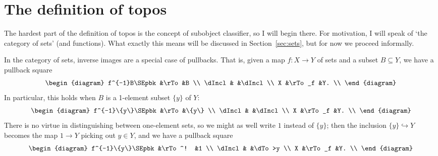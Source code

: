 \documentclass[12pt]{article}
\newcommand{\sub}{\subseteq}
\newcommand{\incl}{\hookrightarrow}
\newcommand{\cln}{\colon}
\begin{document}
\section{The definition of topos}
\label{sec:defn}



The hardest part of the definition of topos is the concept of subobject
classifier, so I will begin there.  For motivation, I will speak of `the
category of sets' (and functions).  What exactly this means will be discussed
in Section~\ref{sec:sets}, but for now we proceed informally.

In the category of sets, inverse images are a special case of pullbacks.
That is, given a map $f\cln X \to Y$ of sets and a subset $B \sub Y$, we have a
pullback square
\[
\begin{diagram}
f^{-1}B\SEpbk   &\rTo   &B      \\
\dIncl          &       &\dIncl \\
X               &\rTo_f &Y.     \\
\end{diagram}
\]
In particular, this holds when $B$ is a 1-element subset $\{y\}$ of $Y$:
\[
\begin{diagram}
f^{-1}\{y\}\SEpbk         &\rTo   &\{y\}  \\
\dIncl                  &       &\dIncl \\
X                       &\rTo_f &Y.     \\
\end{diagram}
\]
There is no virtue in distinguishing between one-element sets, so we might as
well write $1$ instead of $\{y\}$; then the inclusion $\{y\} \incl Y$ becomes
the map $1 \to Y$ picking out $y \in Y$, and we have a pullback square
\[
\begin{diagram}
f^{-1}\{y\}\SEpbk       &\rTo^! &1      \\
\dIncl                  &       &\dTo>y \\
X                       &\rTo_f &Y.     \\
\end{diagram}
\]
\end{document}
